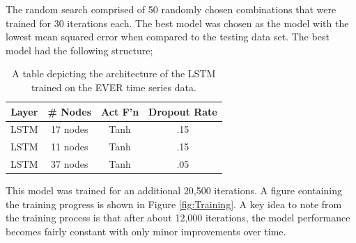 The random search comprised of 50 randomly chosen combinations that were trained for 30 iterations each. The best model was chosen as the model with the lowest mean squared error when compared to the testing data set. The best model had the following structure;

\begin{table}[hbt!]
\centering
\begin{tabular}{|c|c|c|c|}
    \hline 
    Layer & \# Nodes & Act F'n & Dropout Rate \\
    \hline
    LSTM & 17 nodes & Tanh  & .15  \\
    \hline
    LSTM & 11 nodes & Tanh & .15\\
    \hline
    LSTM & 37 nodes & Tanh & .05\\
    \hline
\end{tabular}
\caption{A table depicting the architecture of the LSTM trained on the EVER time series data.}
\label{fig:Architecture}
\end{table}

This model was trained for an additional 20,500 iterations. A figure containing the training progress is shown in Figure \ref{fig:Training}. A key idea to note from the training process is that after about 12,000 iterations, the model performance becomes fairly constant with only minor improvements over time.

